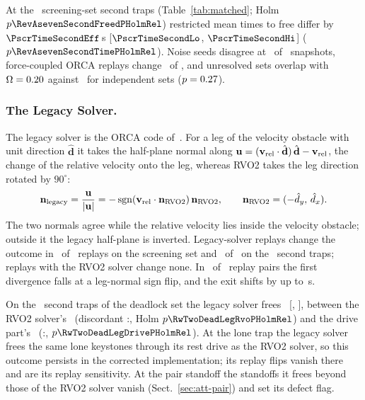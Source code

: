At the \RevAsixSTSnaps\ screening-set second traps (Table~\ref{tab:matched}; Holm $p\RevAsevenSecondFreedPHolmRel$) restricted mean times to free differ by $\PscrTimeSecondEff$\,s [$\PscrTimeSecondLo$, $\PscrTimeSecondHi$] ($p\RevAsevenSecondTimePHolmRel$). Noise seeds disagree at \RevAsixSTNoiseDisagree\ of \RevAsixSTSnaps\ snapshots, force-coupled ORCA replays change \RevAsixSTOrcaReplayDis\ of \RevAsixSTOrcaReplays, and unresolved sets overlap with $\Omega=0.20$ against \RevAsixSTJInd\ for independent sets ($p=0.27$).

\subsubsection{The Legacy Solver.}
The legacy solver is the ORCA code of~\cite{gang2026}. For a leg of the velocity obstacle with unit direction $\hat{\mathbf d}$ it takes the half-plane normal along $\mathbf u=(\mathbf v_{\rm rel}\cdot\hat{\mathbf d})\,\hat{\mathbf d}-\mathbf v_{\rm rel}$, the change of the relative velocity onto the leg, whereas RVO2 takes the leg direction rotated by $90^\circ$:
\begin{equation}\label{eq:legnormal}
\mathbf n_{\rm legacy}=\frac{\mathbf u}{|\mathbf u|}=-\operatorname{sgn}(\mathbf v_{\rm rel}\cdot\mathbf n_{\rm RVO2})\,\mathbf n_{\rm RVO2},\qquad \mathbf n_{\rm RVO2}=(-\hat d_y,\,\hat d_x).
\end{equation}
The two normals agree while the relative velocity lies inside the velocity obstacle; outside it the legacy half-plane is inverted. Legacy-solver replays change the outcome in \EtwoReplayCThreePubFlips\ of \EtwoReplayN\ replays on the screening set and \RevAfiveXPoolLegacyReplayChanged\ of \RevAfiveXPoolLegacyReplays\ on the \RevAfiveXPoolN\ second traps; replays with the RVO2 solver change none. In \FixAfourDiscLegFlip\ of \FixAfourDiscN\ replay pairs the first divergence falls at a leg-normal sign flip, and the exit shifts by up to \PscrReplayPubMaxDt\,s.

On the \RwTwoDeadN\ second traps of the deadlock set the legacy solver frees \RwTwoDeadLegacyFreed\ [\RwTwoDeadLegacyLo, \RwTwoDeadLegacyHi], between the RVO2 solver's \RwTwoDeadRvoFreed\ (discordant \RwTwoDeadLegRvoDiscA:\RwTwoDeadLegRvoDiscB, Holm $p\RwTwoDeadLegRvoPHolmRel$) and the drive part's \RwTwoDeadDriveFreed\ (\RwTwoDeadLegDriveDiscA:\RwTwoDeadLegDriveDiscB, $p\RwTwoDeadLegDrivePHolmRel$). At the lone trap the legacy solver frees the same lone keystones through its rest drive as the RVO2 solver, so this outcome persists in the corrected implementation; its replay flips vanish there and are its replay sensitivity. At the pair standoff the standoffs it frees beyond those of the RVO2 solver vanish (Sect.~\ref{sec:att-pair}) and set its defect flag.

